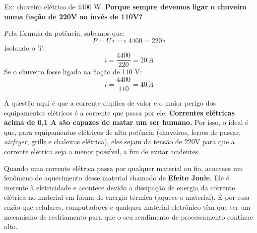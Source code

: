 \documentclass[12pt]{extarticle}
\newcommand{\<}{\langle}
\renewcommand{\>}{\rangle}
\theoremstyle{definition}
\begin{document}
Ex: chuveiro elétrico de 4400 W. \textbf{Porque sempre devemos ligar o chuveiro numa fiação de 220V ao invés de 110V?}

Pela fórmula da potência, sabemos que:
\begin{equation}
    P = U\, i \implies 4400 = 220\,i
\end{equation}
Isolando o 'i':
\begin{equation}
    i = \frac{4400}{220} = 20\, A
\end{equation}
Se o chuveiro fosse ligado na fiação de 110 V:
\begin{equation}
    i =\frac{4400}{110} = 40\, A
\end{equation}

A questão aqui é que a corrente duplica de valor e o maior perigo dos equipamentos elétricos é a corrente que passa por ele. \textbf{Correntes elétricas acima de 0,1 A são capazes de matar um ser humano.} Por isso, o ideal é que, para equipamentos elétricos de alta potência (chuveiros, ferros de passar, \textit{airfryer}, grills e chaleiras elétrica), eles sejam da tensão de 220V para que a corrente elétrica seja a menor possível, a fim de evitar acidentes.

Quando uma corrente elétrica passa por qualquer material ou fio, acontece um fenômeno de aquecimento desse material chamado de \textbf{Efeito Joule}. Ele é inerente à eletricidade e acontece devido a dissipação de energia da corrente elétrica no material em forma de energia térmica (aquece o material). É por essa razão que celulares, computadores e qualquer material eletrônico têm que ter um mecanismo de resfriamento para que o seu rendimento de processamento continue alto.
\end{document}
